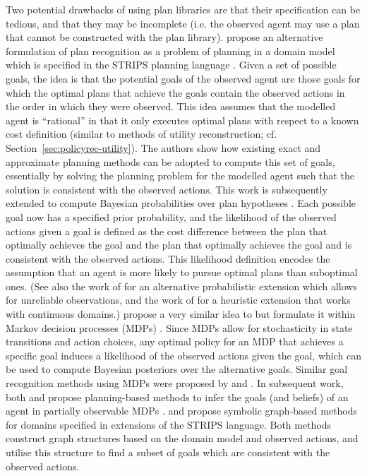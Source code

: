 \documentclass[final,1p,times,authoryear]{elsarticle}
\begin{document}
Two potential drawbacks of using plan libraries are that their specification can be tedious, and that they may be incomplete (i.e. the observed agent may use a plan that cannot be constructed with the plan library). \citet{rg2009} propose an alternative formulation of plan recognition as a problem of planning in a domain model which is specified in the STRIPS planning language \citep{fn1971}. Given a set of possible goals, the idea is that the potential goals of the observed agent are those goals for which the optimal plans that achieve the goals contain the observed actions in the order in which they were observed. This idea assumes that the modelled agent is ``rational'' in that it only executes optimal plans with respect to a known cost definition (similar to methods of utility reconstruction; cf. Section~\ref{sec:policyrec-utility}). The authors show how existing exact and approximate planning methods can be adopted to compute this set of goals, essentially by solving the planning problem for the modelled agent such that the solution is consistent with the observed actions. This work is subsequently extended to compute Bayesian probabilities over plan hypotheses \citep{rg2010}. Each possible goal now has a specified prior probability, and the likelihood of the observed actions given a goal is defined as the cost difference between the plan that optimally achieves the goal and the plan that optimally achieves the goal and is consistent with the observed actions. This likelihood definition encodes the assumption that an agent is more likely to pursue optimal plans than suboptimal ones. (See also the work of \citet{sru2016} for an alternative probabilistic extension which allows for unreliable observations, and the work of \citet{vk2017} for a heuristic extension that works with continuous domains.) \citet{bst2009,bts2005} propose a very similar idea to \citet{rg2009} but formulate it within Markov decision processes (MDPs) \citep{b1957}. Since MDPs allow for stochasticity in state transitions and action choices, any optimal policy for an MDP that achieves a specific goal induces a likelihood of the observed actions given the goal, which can be used to compute Bayesian posteriors over the alternative goals. Similar goal recognition methods using MDPs were proposed by \citet{capir2011} and \citet{ft2010}. In subsequent work, both \citet{bst2011} and \citet{rh2011} propose planning-based methods to infer the goals (and beliefs) of an agent in partially observable MDPs \citep{klc1998}. \citet{le1995} and \citet{h2001,h2000} propose symbolic graph-based methods for domains specified in extensions of the STRIPS language. Both methods construct graph structures based on the domain model and observed actions, and utilise this structure to find a subset of goals which are consistent with the observed actions.
\end{document}

